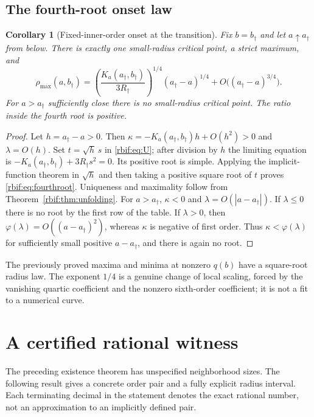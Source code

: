\documentclass[11pt,a4paper]{article}
\newtheorem{corollary}[theorem]{Corollary}
\theoremstyle{definition}\newtheorem{definition}[theorem]{Definition}
\theoremstyle{remark}\newtheorem{remark}[theorem]{Remark}
\newcommand{\rbpa}{a_\dagger}
\newcommand{\rbpb}{b_\dagger}
\newcommand{\rbrr}{R_\dagger}
\numberwithin{equation}{section}
\begin{document}
\subsection{The fourth-root onset law}
\begin{corollary}[Fixed-inner-order onset at the transition]
\label{rbif:cor:fourthroot}
Fix $b=\rbpb$ and let $a\uparrow\rbpa$ from below. There is exactly
one small-radius critical point, a strict maximum, and
\begin{equation}
 \rho_{\max}(a,\rbpb)
 =\left(\frac{K_a(\rbpa,\rbpb)}{3\rbrr}\right)^{1/4}
       (\rbpa-a)^{1/4}
       +O\bigl((\rbpa-a)^{3/4}\bigr).
 \label{rbif:eq:fourthroot}
\end{equation}
For $a>\rbpa$ sufficiently close there is no small-radius critical
point. The ratio inside the fourth root is positive.
\end{corollary}
\begin{proof}
Let $h=\rbpa-a>0$. Then
$\kappa=-K_a(\rbpa,\rbpb)h+O(h^2)>0$ and $\lambda=O(h)$.
Set $t=\sqrt h\,s$ in \eqref{rbif:eq:U}; after division by $h$ the
limiting equation is
$-K_a(\rbpa,\rbpb)+3\rbrr s^2=0$.
Its positive root is simple. Applying the implicit-function theorem in
$\sqrt h$ and then taking a positive square root of $t$ proves
\eqref{rbif:eq:fourthroot}. Uniqueness and maximality follow from
Theorem~\ref{rbif:thm:unfolding}.
For $a>\rbpa$, $\kappa<0$ and $\lambda=O(|a-\rbpa|)$.
If $\lambda\le0$ there is no root by the first row of the table.
If $\lambda>0$, then
$\varphi(\lambda)=O((a-\rbpa)^2)$, whereas $\kappa$ is negative
of first order. Thus $\kappa<\varphi(\lambda)$ for sufficiently small
positive $a-\rbpa$, and there is again no root.
\end{proof}

The previously proved maxima and minima at nonzero $q(b)$ have a
square-root radius law. The exponent $1/4$ is a genuine change of local
scaling, forced by the vanishing quartic coefficient and the nonzero
sixth-order coefficient; it is not a fit to a numerical curve.

\section{A certified rational witness}
\label{rbif:sec:witness}
The preceding existence theorem has unspecified neighborhood sizes.
The following result gives a concrete order pair and a fully explicit
radius interval. Each terminating decimal in the statement denotes the
exact rational number, not an approximation to an implicitly defined pair.
\end{document}
